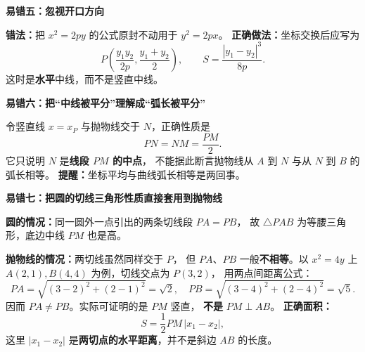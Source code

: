 \begin{trapbox}
    \medskip
    \par\noindent\begin{minipage}{\linewidth}
    \textbf{\textcolor{CTrap}{易错五：忽视开口方向}}

    
    \end{minipage}\par

    \textbf{错法：}把 $x^2=2py$ 的公式原封不动用于 $y^2=2px$。
    \textbf{正确做法：}坐标交换后应写为
    \[
        P\left(\frac{y_1y_2}{2p},\frac{y_1+y_2}{2}\right),\qquad
        S=\frac{|y_1-y_2|^3}{8p}.
    \]
    这时是\textbf{水平}中线，而不是竖直中线。

    \medskip
    \textbf{\textcolor{CTrap}{易错六：把“中线被平分”理解成“弧长被平分”}}

    令竖直线 $x=x_P$ 与抛物线交于 $N$，正确性质是
    \[
        PN=NM=\frac{PM}{2}.
    \]
    它只说明 $N$ 是\textbf{线段 $PM$ 的中点}，
    不能据此断言抛物线从 $A$ 到 $N$ 与从 $N$ 到 $B$ 的弧长相等。
    \textbf{提醒：}坐标平均与曲线弧长相等是两回事。

    \medskip
    \textbf{\textcolor{CTrap}{易错七：把圆的切线三角形性质直接套用到抛物线}}

    \textbf{圆的情况：}同一圆外一点引出的两条切线段 $PA=PB$，
    故 $\triangle PAB$ 为等腰三角形，底边中线 $PM$ 也是高。

    \textbf{抛物线的情况：}两切线虽然同样交于 $P$，
    但 $PA$、$PB$ 一般\textbf{不相等}。以
    $x^2=4y$ 上 $A(2,1),B(4,4)$ 为例，切线交点为 $P(3,2)$，
    用两点间距离公式：
    \[
        PA=\sqrt{(3-2)^2+(2-1)^2}=\sqrt2,
        \quad PB=\sqrt{(3-4)^2+(2-4)^2}=\sqrt5.
    \]
    因而 $PA\ne PB$。实际可证明的是 $PM$ 竖直，
    \textbf{不是} $PM\perp AB$。
    \textbf{正确面积：}
    \[
        \boxed{S=\frac12 PM\,|x_1-x_2|},
    \]
    这里 $|x_1-x_2|$ 是\textbf{两切点的水平距离}，并不是斜边 $AB$ 的长度。

\end{trapbox}
